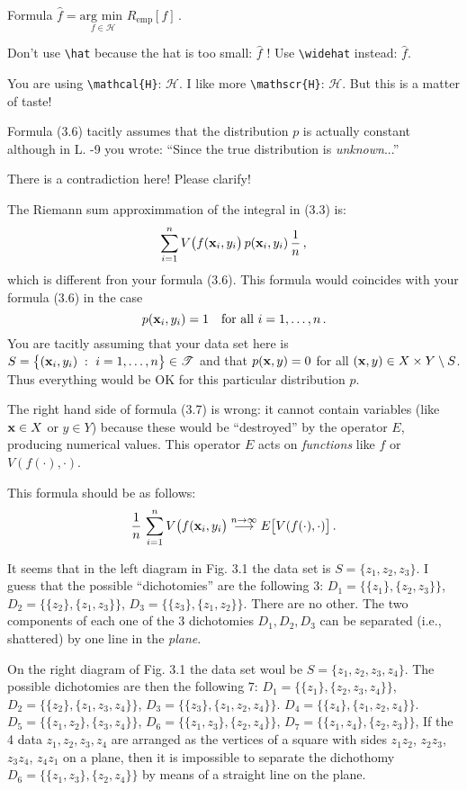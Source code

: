 \begin{description}[style=unboxed,leftmargin=0cm,itemsep=3ex]
Formula\quad
$\displaystyle\widehat{f}
=\underset{f\in\mathscr{H}}{\text{arg min\ }} R_{\text{emp}}[f]$\,.

Don't use \verb|\hat| because the hat is too small: $\hat{f}$ !\quad
Use \verb|\widehat| instead: $\widehat{f}$.

You are using \verb|\mathcal{H}|: $\mathcal{H}$.
I like more \verb|\mathscr{H}|: $\mathscr{H}$.
But this is a matter of taste!


Formula (3.6) tacitly assumes that the distribution $p$ is actually constant
although in L. -9 you wrote: 
``Since the true distribution is {\em unknown\/}...''

There is a contradiction here! Please clarify!

The Riemann sum approximmation of the integral in (3.3) is:
$$
\sum_{i=1}^n V\big( f(\mathbf{x}_i,y_i \big)\,p(\mathbf{x}_i,y_i)\,\frac1n\,,
$$
which is different fron your formula (3.6).
This formula would coincides with your formula (3.6) in the case
$$
p(\mathbf{x}_i,y_i)=1\quad \text{for all}\ i=1,\dots,n\,.
$$
You are tacitly assuming that your data set here is
$S=\big\{ (\mathbf{x}_i,y_i)\;:\  i=1,\dots,n\big\}\in\mathscr{T}$ and
that $p(\mathbf{x},y)=0$ for all $(\mathbf{x},y)\in X\times Y\setminus S$.
Thus everything would be OK for this particular distribution $p$.

The right hand side of formula (3.7) is wrong:
it cannot contain variables (like $\mathbf{x}\in X$ or $y\in Y$) because these
would be ``destroyed'' by the operator $E$, producing numerical values.
This operator $E$ acts on {\em functions\/} like $f$ or $V(f(\cdot),\cdot)$.

This formula should be as follows:
$$
\frac1n\,\sum_{i=1}^n V\big( f(\mathbf{x}_i,y_i \big)
\overset{n\to\infty}{\longrightarrow} E\big[ V(f(\cdot),\cdot)\big]\,.
$$

\mbox{}\newline
It seems that in the left diagram in Fig. 3.1 the data set is
$S=\{z_1,z_2,z_3\}$.
I guess that the possible ``dichotomies'' are the following $3$: 
$D_1=\big\{ \{z_1\}, \{z_2,z_3\} \big\}$,
$D_2=\big\{ \{z_2\}, \{z_1,z_3\} \big\}$,
$D_3=\big\{ \{z_3\}, \{z_1,z_2\} \big\}$.
There are no other.
The two components of each one of the 3 dichotomies $D_1, D_2,D_3$ can
be separated (i.e., shattered) by one line in the {\em plane\/}.

On the right diagram of Fig. 3.1 the data set woul be $S=\{z_1,z_2,z_3,z_4\}$.
The possible dichotomies are then the following $7$:
$D_1=\big\{ \{z_1\}, \{z_2,z_3,z_4\} \big\}$,
$D_2=\big\{ \{z_2\}, \{z_1,z_3,z_4\} \big\}$,
$D_3=\big\{ \{z_3\}, \{z_1,z_2,z_4\} \big\}$.
$D_4=\big\{ \{z_4\}, \{z_1,z_2,z_4\} \big\}$.
$D_5=\big\{ \{z_1,z_2\}, \{z_3,z_4\} \big\}$,
$D_6=\big\{ \{z_1,z_3\}, \{z_2,z_4\} \big\}$,
$D_7=\big\{ \{z_1,z_4\}, \{z_2,z_3\} \big\}$,
If the 4 data $z_1,z_2,z_3,z_4$ are arranged as the vertices of a square
with sides $z_1z_2$, $z_2z_3$, $z_3z_4$, $z_4z_1$ on a plane, then it is
impossible to separate the dichothomy
$D_6=\big\{ \{z_1,z_3\}, \{z_2,z_4\} \big\}$
by means of a straight line on the plane.


\end{description}
